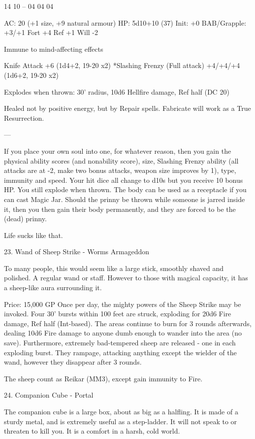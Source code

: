 \begin{multicols}{2}
14 10 -- 04 04 04

AC: 20 (+1 size, +9 natural armour)
HP: 5d10+10 (37)
Init: +0
BAB/Grapple: +3/+1
Fort +4
Ref +1
Will -2

Immune to mind-affecting effects

Knife Attack +6 (1d4+2, 19-20 x2)
*Slashing Frenzy (Full attack) +4/+4/+4 (1d6+2, 19-20 x2)

Explodes when thrown: 30' radius, 10d6 Hellfire damage, Ref half (DC 20)

Healed not by positive energy, but by Repair spells. Fabricate will work as a True Resurrection.

---

If you place your own soul into one, for whatever reason, then you gain the physical ability scores (and nonability score), size, Slashing Frenzy ability (all attacks are at -2, make two bonus attacks, weapon size improves by 1), type, immunity and speed. Your hit dice all change to d10s but you receive 10 bonus HP. You still explode when thrown. The body can be used as a receptacle if you can cast Magic Jar. Should the prinny be thrown while someone is jarred inside it, then you then gain their body permanently, and they are forced to be the (dead) prinny.

Life sucks like that. 


23. Wand of Sheep Strike - Worms Armageddon

To many people, this would seem like a large stick, smoothly shaved and polished. A regular wand or staff. However to those with magical capacity, it has a sheep-like aura surrounding it.

Price: 15,000 GP
Once per day, the mighty powers of the Sheep Strike may be invoked. Four 30' bursts within 100 feet are struck, exploding for 20d6 Fire damage, Ref half (Int-based). The areas continue to burn for 3 rounds afterwards, dealing 10d6 Fire damage to anyone dumb enough to wander into the area (no save). Furthermore, extremely bad-tempered sheep are released - one in each exploding burst. They rampage, attacking anything except the wielder of the wand, however they disappear after 3 rounds.

The sheep count as Reikar (MM3), except gain immunity to Fire.


24. Companion Cube - Portal

The companion cube is a large box, about as big as a halfling. It is made of a sturdy metal, and is extremely useful as a step-ladder. It will not speak to or threaten to kill you. It is a comfort in a harsh, cold world.


\end{multicols}
